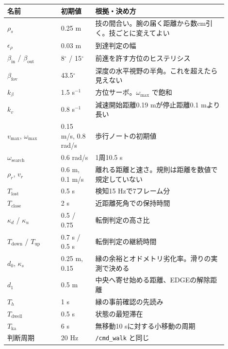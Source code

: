 \documentclass[a4paper,11pt]{ltjsarticle}
\newcommand{\code}[1]{\texttt{#1}}
\begin{document}
\begin{center}\small
\begin{tabular}{p{0.22\linewidth}p{0.14\linewidth}p{0.54\linewidth}}
\toprule
名前 & 初期値 & 根拠・決め方 \\
\midrule
$\rho_s$ & 0.25 m & 技の間合い。腕の届く距離から数cm引く。技ごとに変えてよい \\
$\epsilon_\rho$ & 0.03 m & 到達判定の幅 \\
$\beta_\mathrm{in}$ / $\beta_\mathrm{out}$ & 8$^\circ$ / 15$^\circ$ & 前進を許す方位のヒステリシス \\
$\beta_\mathrm{fov}$ & 43.5$^\circ$ & 深度の水平視野の半角。これを超えたら見えない \\
$k_\beta$ & 1.5 s$^{-1}$ & 方位サーボ。$\omega_{\max}$ で飽和 \\
$k_v$ & 0.8 s$^{-1}$ & 減速開始距離0.19 mが停止距離0.1 mより長い \\
$v_{\max}$, $\omega_{\max}$ & 0.15 m/s, 0.8 rad/s & 歩行ノートの初期値 \\
$\omega_\mathrm{search}$ & 0.6 rad/s & 1周10.5 s \\
$\rho_r$, $v_r$ & 0.6 m, 0.1 m/s & 離れる距離と速さ。規則は距離を数値で規定していない \\
$T_\mathrm{lost}$ & 0.5 s & 検知15 Hzで7フレーム分 \\
$T_\mathrm{close}$ & 2 s & 近距離死角での保持時間 \\
$\kappa_d$ / $\kappa_u$ & 0.5 / 0.75 & 転倒判定の高さ比 \\
$T_\mathrm{down}$ / $T_\mathrm{up}$ & 0.7 s / 0.5 s & 転倒判定の継続時間 \\
$d_0$, $\kappa_s$ & 0.25 m, 0.15 & 縁の余裕とオドメトリ劣化率。滑りの実測で決める \\
$d_1$ & 0.5 m & 中央へ寄せ始める距離、EDGEの解除距離 \\
$T_h$ & 1 s & 縁の事前確認の先読み \\
$T_\mathrm{dwell}$ & 0.5 s & 状態の最短滞在 \\
$T_\mathrm{ka}$ & 6 s & 無移動10 sに対する小移動の周期 \\
判断周期 & 20 Hz & \code{/cmd\_walk} と同じ \\
\bottomrule
\end{tabular}
\end{center}
\end{document}
